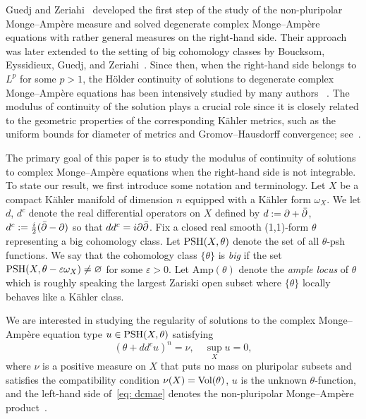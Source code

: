 \documentclass[a4paper,11pt]{amsart}
\numberwithin{equation}{section}
\theoremstyle{definition}
\newcommand{\Vol}{{\rm Vol}}
\newcommand{\ddc}{dd^c}
\newcommand{\PSH}{{\rm PSH}}
\begin{document}
Guedj and Zeriahi~\cite{guedj2007weighted} developed the first step of the study of the non-pluripolar Monge--Amp\`ere measure and solved degenerate complex Monge--Amp\`ere equations with rather general measures on the right-hand side. Their approach was later extended to the setting of big cohomology classes by Boucksom, Eyssidieux, Guedj, and Zeriahi~\cite{boucksom2010monge}. Since then, when the right-hand side belongs to $L^p$ for some $p>1$, the H\"older continuity of solutions to degenerate complex Monge--Amp\`ere equations has been intensively studied by many authors ~\cite{kolodziej1998complex,kolodziej2008holder,
hiep2010holder,
eyssidieux2011viscosity,boucksom2010monge,demailly2014holder, dinh2014characterization, 
dang2021continuity,dinh2022complex}. 
The modulus of continuity of the solution plays a crucial role since it is closely related to the geometric properties of the corresponding K\"ahler metrics, such as the uniform bounds for diameter of metrics and Gromov--Hausdorff convergence; see~\cite{Fu-Guo-Song2020-geometric,guo2022-local,guo2021modulus,guo2022-diameter, Guo2024-diameter2,guedj2025-diameter,vu2024continuity,do2023log,Guedj-To-25-green,vu24-diameter,nguyen-vu24-diameter}. 
 

The primary goal of this paper is to study the modulus of continuity of solutions to complex Monge--Ampère equations when the right-hand side is not integrable.
To state our result, we first introduce some notation and terminology. Let $X$ be a compact K\"ahler manifold of dimension $n$ equipped with a K\"ahler form $\omega_X$. We let $d$, $d^c$ denote the real differential operators on $X$ defined by $d:=\partial+\Bar{\partial}$, $d^c:=\frac{i}{2}(\Bar{\partial}-\partial)$ so that $\ddc=i\partial\Bar{\partial}$.
Fix a closed real smooth (1,1)-form $\theta$ representing a big cohomology class. Let $\PSH(X,\theta)$ denote the set of all $\theta$-psh functions. 
We say that the cohomology class $\{\theta\}$ is {\em big} if the set $\PSH(X,\theta-\varepsilon\omega_X)\neq \varnothing$ for some $\varepsilon>0$.
Let $\textrm{Amp}(\theta)$ denote the {\em ample locus} of $\theta$ which is roughly speaking the largest Zariski open subset where $\{\theta\}$ locally behaves like
a K\"ahler class. 

We are interested in studying the regularity of solutions to the complex Monge--Amp\`ere equation type $u\in\PSH(X,\theta)$ satisfying \begin{equation}\label{eq: dcmae}
   (\theta+\ddc u)^n=\nu,\quad\sup_X u=0, 
\end{equation}
where
$\nu$ is a positive measure on $X$ that puts no mass on pluripolar subsets and satisfies the compatibility condition $\nu(X)=\Vol(\theta)$, $u$ is the unknown $\theta$-function, and the left-hand side of~\eqref{eq: dcmae} denotes the non-pluripolar Monge--Amp\`ere product~\cite{bedford1987fine,boucksom2010monge}. 
\end{document}
